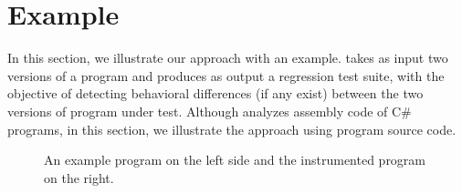 \vspace{-3ex}
\section{Example}
\label{sec:example}
\vspace{-2ex}
In this section, we illustrate our  approach with an example.  takes as input two versions of a program and produces as output a regression test suite, with the objective of detecting behavioral differences (if any exist) between the two versions of program under test. Although  analyzes assembly code of C\# programs, in this section, we illustrate the  approach using program source code. 

    \begin{figure}[t]
    \centering
         
    \vspace{-0.6cm}
    \caption{\scriptsize{An example program on the left side and the instrumented program on the right.}}
    \label{fig:example}
     \vspace{-0.7cm}
    \end{figure}
    

